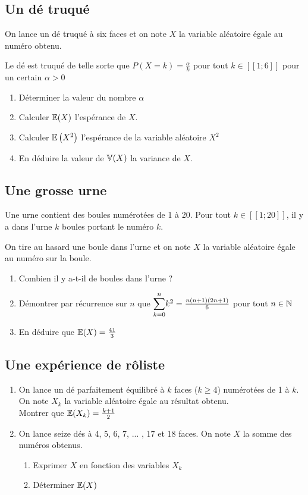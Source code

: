 \documentclass[oneside,12pt]{book}          %
\begin{document}
\subsection{Un dé truqué}
On lance un dé truqué à six faces et on note $X$ la variable aléatoire égale au numéro obtenu.

Le dé est truqué de telle sorte que $P(X=k)=\frac{\alpha}{k}$ pour tout $k\in[\![1;6]\!]$ pour un certain $\alpha>0$

\begin{enumerate}
    \item Déterminer la valeur du nombre $\alpha$
    \item Calculer ${\mathbb E}(X)$ l'espérance de $X$.
    \item Calculer ${\mathbb E}\left(X^2\right)$ l'espérance de la variable aléatoire $X^2$
    \item En déduire la valeur de ${\mathbb V}(X)$ la variance de $X$.
\end{enumerate}



\subsection{Une grosse urne}
Une urne contient des boules numérotées de 1 à 20. Pour tout $k\in[\![1;20]\!]$, il y a dans l'urne $k$ boules portant le numéro $k$.

On tire au hasard une boule dans l'urne et on note $X$ la variable aléatoire égale au numéro sur la boule.

\begin{enumerate}
    \item Combien il y a-t-il de boules dans l'urne ?
    \item Démontrer par récurrence sur $n$ que ${\displaystyle\sum_{k=0}^{n}}k^2=\frac{n(n+1)(2n+1)}{6}$ pour tout ${n\in\mathbb N}$
    \item En déduire que ${\mathbb E}(X)=\frac{41}{3}$
\end{enumerate}



\subsection{Une expérience de rôliste}
\begin{enumerate}
    \item On lance un dé parfaitement équilibré à $k$ faces ($k\geq4$) numérotées de 1 à $k$.\\
    On note $X_k$ la variable aléatoire égale au résultat obtenu.\\
    Montrer que ${\mathbb E}(X_k)=\frac{k+1}{2}$
    \item On lance seize dés à 4, 5, 6, 7, ... , 17 et 18 faces. On note $X$ la somme des numéros obtenus.
    \begin{enumerate}
    	\item Exprimer $X$ en fonction des variables $X_k$
    	\item Déterminer ${\mathbb E}(X)$
    \end{enumerate}
\end{enumerate}
\end{document}
